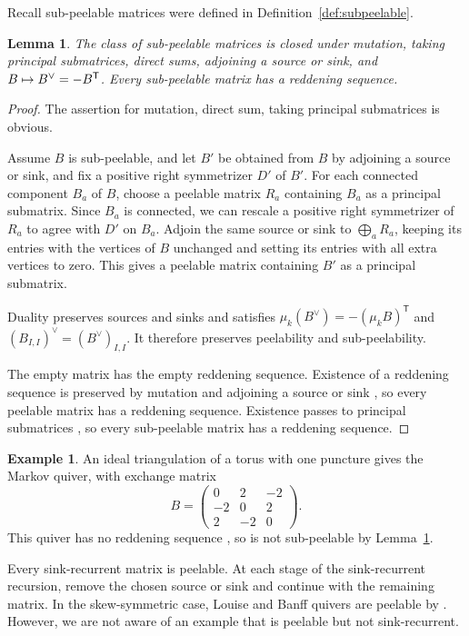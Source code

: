 \documentclass[12pt, letter]{amsart}
\newtheorem{lemma}[theorem]{Lemma}
\theoremstyle{definition}
\newtheorem{example}[theorem]{Example}
\numberwithin{equation}{section}
\begin{document}
Recall sub-peelable matrices were defined in Definition~\ref{def:subpeelable}.
\begin{lemma}\label{lem:class}
The class of sub-peelable matrices is closed under mutation, taking principal
submatrices, direct sums, adjoining a source or sink, and
$B\mapsto B^\vee = -B^\mathsf T$. Every sub-peelable matrix has a reddening sequence.
\end{lemma}
\begin{proof}
The assertion for mutation, direct sum, taking principal submatrices is obvious. 



Assume \(B\) is sub-peelable,
and let $B'$ be obtained from $B$ by adjoining a source or sink,
and fix a positive right symmetrizer $D'$ of $B'$.
For each connected component $B_a$ of $B$, choose a peelable
matrix $R_a$ containing $B_a$ as a principal submatrix.
Since $B_a$ is connected, we can rescale a positive right
symmetrizer of $R_a$ to agree with $D'$ on $B_a$.
Adjoin the same source or sink to $\bigoplus_a R_a$,
keeping its entries with the vertices of $B$ unchanged
and setting its entries with all extra vertices to zero.
This gives a peelable matrix containing $B'$ as a principal submatrix.

Duality preserves sources and sinks and satisfies
$
 \mu_k(B^\vee)=-(\mu_kB)^{\mathsf T}$ and $ (B_{I,I})^\vee=(B^\vee)_{I,I}$.
It therefore preserves peelability and sub-peelability.

The empty matrix has the empty reddening sequence.
Existence of a reddening sequence is preserved by mutation
\cite[Corollary~3.8]{LP} and adjoining a source or sink
\cite[Theorem~4.5 and Remark~4.6]{CL}, so every peelable matrix has a reddening sequence.
Existence  passes to principal submatrices
\cite[Lemma~4.9]{CL}, so every sub-peelable matrix has a
reddening sequence.
\end{proof}
\begin{example} \label{nonexample}
An ideal triangulation of a torus with one puncture
gives the Markov quiver, with exchange matrix
\[
 B=\begin{pmatrix}
 0&2&-2\\-2&0&2\\2&-2&0
 \end{pmatrix}.
\]
This quiver has no reddening sequence  \cite[Remark~3.4]{Ladkani}, so  is not sub-peelable by Lemma~\ref{lem:class}.
\end{example}

Every sink-recurrent matrix is peelable. At each stage of the
sink-recurrent recursion, remove the chosen source or sink and
continue with the remaining matrix.
In the skew-symmetric case, Louise and Banff quivers are peelable
by \cite[Corollary~3.6]{EJ}. However, we are not aware of an example that is peelable but not sink-recurrent. 
\end{document}

